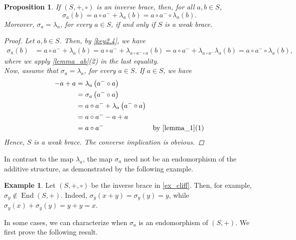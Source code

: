 \documentclass[preprint,1p]{elsarticle}
\newtheorem{prop}[theor]{Proposition}
\theoremstyle{definition}               %
\newtheorem{ex}[theor]{Example}
\DeclareMathOperator{\End}{End}
\begin{document}
\begin{prop}\label{rem_sigma_lambda}
If $(S, +, \circ)$ is an inverse brace, then, for all $a, b \in S$,
$$\sigma_a(b)=a \circ a^- + \lambda_a(b)=a \circ a^- \circ \lambda_a(b).$$
Moreover, $\sigma_a=\lambda_a$, for every $a \in S$, if and only if $S$ is a weak brace.
    \begin{proof}
        Let $a, b \in S$. Then, by \cref{key2.4}, we have
        \begin{align*}
        \sigma_a(b)&=a \circ a^-+\lambda_a( b)=a \circ a^-+\lambda_{a \circ a^- \circ a}(b)=a \circ a^-+\lambda_{a \circ a^- }\lambda_a(b)=a \circ a^- \circ \lambda_a(b),
        \end{align*}
        where we apply \cref{lemma_ab}(2) in the last equality. \\
   Now, assume that $\sigma_a=\lambda_a$, for every $a \in S$. If $a \in S$, %
 we have
   \begin{align*}
      -a+a&=\lambda_a\left(a^- \circ a\right)\\
      &=\sigma_a\left(a^- \circ a\right)\\
      &=a \circ a^- + \lambda_a\left(a^- \circ a\right)\\
      &=a \circ a^--a+a\\
      &=a \circ a^- &\mbox{by \cref{lemma_1}(1)}
   \end{align*}
   Hence, $S$ is a weak brace. The converse implication is obvious.
    \end{proof}
\end{prop}

\smallskip

In contrast to the map $\lambda_a$, the map $\sigma_a$ need not be an endomorphism of the additive structure,  as demonstrated by the following example.
\begin{ex}
    Let $(S,+,\circ)$ be the inverse brace in \cref{ex_cliff}. 
    Then, for example, $\sigma_y \notin \End(S,+)$. Indeed, $\sigma_y(x+y)=\sigma_y(y)=y$, while $\sigma_y(x)+\sigma_y(y)=y+y=x$.
   \end{ex}

\smallskip

\noindent In some cases, we can characterize when $\sigma_a$ is an endomorphism of $(S, +)$. We first prove the following result.
\end{document}
